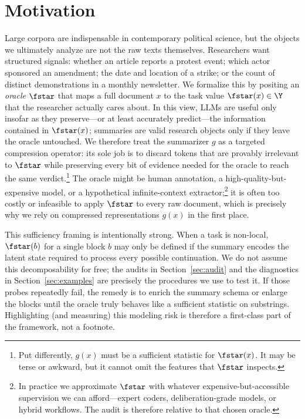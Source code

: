 \section{Motivation}\label{sec:motivation}

Large corpora are indispensable in contemporary political science, but the objects we ultimately analyze are not the raw texts themselves. Researchers want structured signals: whether an article reports a protest event; which actor sponsored an amendment; the date and location of a strike; or the count of distinct demonstrations in a monthly newsletter. We formalize this by positing an \emph{oracle} $\fstar$ that maps a full document $x$ to the task value $\fstar(x)\in\Y$ that the researcher actually cares about. In this view, LLMs are useful only insofar as they preserve---or at least accurately predict---the information contained in $\fstar(x)$; summaries are valid research objects only if they leave the oracle untouched. We therefore treat the summarizer $g$ as a targeted compression operator: its sole job is to discard tokens that are provably irrelevant to $\fstar$ while preserving every bit of evidence needed for the oracle to reach the same verdict.\footnote{Put differently, $g(x)$ must be a sufficient statistic for $\fstar(x)$. It may be terse or awkward, but it cannot omit the features that $\fstar$ inspects.} The oracle might be human annotation, a high-quality-but-expensive model, or a hypothetical infinite-context extractor;\footnote{In practice we approximate $\fstar$ with whatever expensive-but-accessible supervision we can afford—expert coders, deliberation-grade models, or hybrid workflows. The audit is therefore relative to that chosen oracle.} it is often too costly or infeasible to apply $\fstar$ to every raw document, which is precisely why we rely on compressed representations $g(x)$ in the first place.

This sufficiency framing is intentionally strong. When a task is non-local, $\fstar(b)$ for a single block $b$ may only be defined if the summary encodes the latent state required to process every possible continuation. We do not assume this decomposability for free; the audits in Section~\ref{sec:audit} and the diagnostics in Section~\ref{sec:examples} are precisely the procedures we use to test it. If those probes repeatedly fail, the remedy is to enrich the summary schema or enlarge the blocks until the oracle truly behaves like a sufficient statistic on substrings. Highlighting (and measuring) this modeling risk is therefore a first-class part of the framework, not a footnote.

